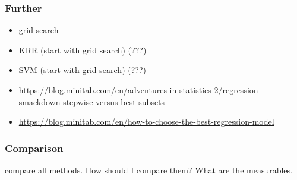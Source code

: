 \subsubsection{Further}
\begin{itemize}
    \item grid search
    \item KRR (start with grid search) (???)
    \item SVM (start with grid search) (???)
    \item \url{https://blog.minitab.com/en/adventures-in-statistics-2/regression-smackdown-stepwise-versus-best-subsets}
    \item \url{https://blog.minitab.com/en/how-to-choose-the-best-regression-model}
\end{itemize}

\subsubsection{Comparison} 
compare all methods. 
How should I compare them? 
What are the measurables. 
\fi


